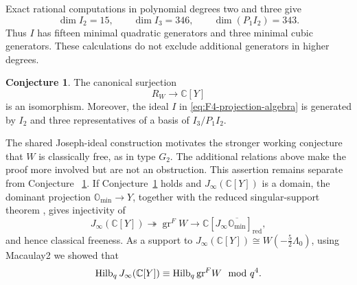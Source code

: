 \documentclass[11pt]{amsart}
\theoremstyle{definition}
\newtheorem{conjecture}[theorem]{Conjecture}
\theoremstyle{remark}
\newcommand{\C}{\mathbb C}
\DeclareMathOperator{\gr}{gr}
\begin{document}
Exact rational computations in polynomial degrees two and three give
\[
 \dim I_2=15,\qquad
 \dim I_3=346,\qquad
 \dim(P_1I_2)=343.
\]
Thus $I$ has fifteen minimal quadratic generators and three
minimal cubic generators. These calculations do not exclude
additional generators in higher degrees.

\begin{conjecture}\label{conj:F4-presentation}
The canonical surjection
\[
 R_W\longrightarrow\C[Y]
\]
is an isomorphism. Moreover, the ideal $I$ in
\eqref{eq:F4-projection-algebra} is generated by $I_2$ and three
representatives of a basis of $I_3/P_1I_2$.
\end{conjecture}


The shared Joseph-ideal construction motivates the stronger working
conjecture that $W$ is classically free, as in type $G_2$. The additional
relations above make the proof more involved but are not an obstruction.
This assertion remains separate from Conjecture~
\ref{conj:F4-presentation}.
If Conjecture~\ref{conj:F4-presentation} holds and
$J_\infty(\C[Y])$ is a domain, the dominant projection
$\mathbb O_{\min}\to Y$, together with the reduced
singular-support theorem \cite{AMArc}, gives injectivity of
\[
 J_\infty(\C[Y])
 \twoheadrightarrow\gr^F W
 \longrightarrow
 \C[J_\infty\overline{\mathbb O_{\min}}]_{\mathrm{red}},
\]
and hence classical freeness.
As a support to $ J_\infty(\C[Y]) \cong W(-\frac52 \Lambda_0)$, using Macaulay2 we showed that 
\[
 \operatorname{Hilb}_q J_\infty(\C[Y]) \equiv \operatorname{Hilb}_q {\rm gr}^F W \mod  q^4.
 \]

\color{black}
\end{document}
